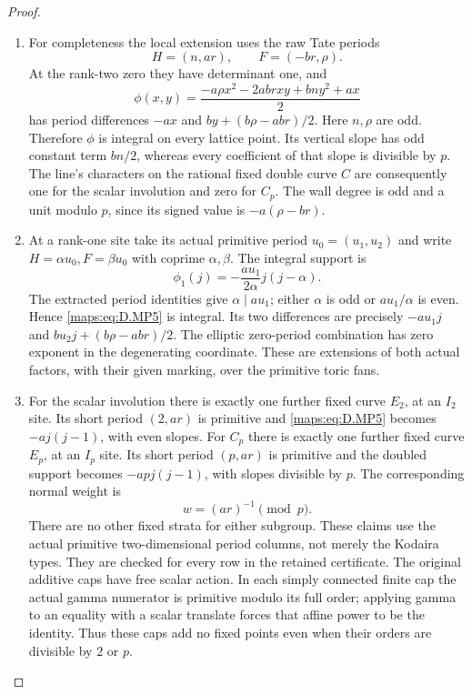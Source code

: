 \begin{proof}
\begin{enumerate}[label=\arabic*.,leftmargin=*]
\item For completeness the local extension uses the raw Tate periods
\[
 H=(n,ar),\qquad F=(-br,\rho).
\]
At the rank-two zero they have determinant one, and
\[
 \phi(x,y)=\frac{-a\rho x^2-2ab rxy+bn y^2+ax}{2}
                                                        \tag{D.MP4}\label{maps:eq:D.MP4}
\]
has period differences $-ax$ and $by+(b\rho-ab r)/2$.
Here $n,\rho$ are odd. Therefore $\phi$ is integral on every
lattice point. Its vertical slope has odd constant term
$bn/2$, whereas every coefficient of that slope is divisible
by $p$. The line's characters on the rational fixed double
curve $C$ are consequently one for the scalar involution and
zero for $C_p$. The wall degree is odd and a unit modulo $p$,
since its signed value is $-a(\rho-br)$.

\item At a rank-one site take its actual primitive period $u_0=(u_1,u_2)$
and write $H=\alpha u_0,F=\beta u_0$ with coprime
$\alpha,\beta$. The integral support is
\[
       \phi_1(j)=-\frac{a u_1}{2\alpha}j(j-\alpha).
                                                        \tag{D.MP5}\label{maps:eq:D.MP5}
\]
The extracted period identities give $\alpha\mid a u_1$;
either $\alpha$ is odd or $a u_1/\alpha$ is even. Hence \eqref{maps:eq:D.MP5}
is integral. Its two differences are precisely
$-a u_1j$ and $b u_2j+(b\rho-ab r)/2$. The elliptic
zero-period combination has zero exponent in the degenerating
coordinate. These are extensions of both actual factors, with
their given marking, over the primitive toric fans.

\item For the scalar involution there is exactly one further fixed
curve $E_2$, at an $I_2$ site. Its short period $(2,ar)$ is
primitive and \eqref{maps:eq:D.MP5} becomes $-a j(j-1)$, with even slopes.
For $C_p$ there is exactly one further fixed curve $E_p$,
at an $I_p$ site. Its short period $(p,ar)$ is primitive and
the doubled support becomes $-ap j(j-1)$, with slopes
divisible by $p$. The corresponding normal weight is
\[
                         w=(ar)^{-1}\pmod p.             \tag{D.MP6}\label{maps:eq:D.MP6}
\]
There are no other fixed strata for either subgroup. These
claims use the actual primitive two-dimensional period columns,
not merely the Kodaira types. They are checked for every row
in the retained certificate. The original additive caps have
free scalar action. In each simply connected finite cap the
actual gamma numerator is primitive modulo its full order;
applying gamma to an equality with a scalar translate forces
that affine power to be the identity. Thus these caps add no
fixed points even when their orders are divisible by $2$ or $p$.


\end{enumerate}
\end{proof}
